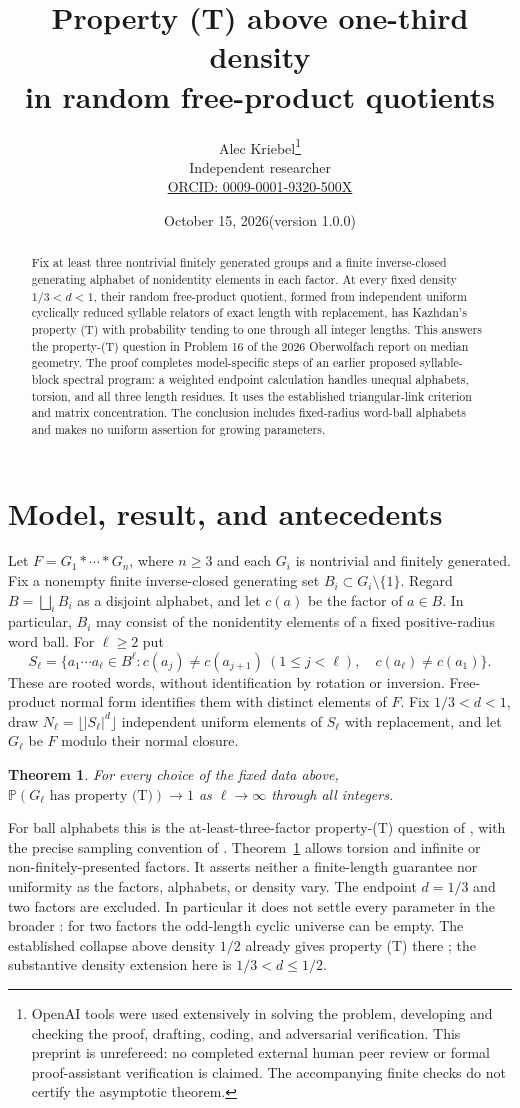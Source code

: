 \documentclass[11pt,letterpaper]{article}
\title{Property (T) above one-third density\texorpdfstring{\\}{ }in random free-product quotients}
\author{Alec Kriebel\thanks{OpenAI tools were used extensively in solving the problem, developing and checking the proof, drafting, coding, and adversarial verification. This preprint is unrefereed: no completed external human peer review or formal proof-assistant verification is claimed. The accompanying finite checks do not certify the asymptotic theorem.}\\
  \small Independent researcher\\
  \small\href{https://orcid.org/0009-0001-9320-500X}{ORCID: 0009-0001-9320-500X}}
\date{October 15, 2026\quad (version 1.0.0)}
\newtheorem{theorem}{Theorem}
\newcommand{\Prob}{\mathbb P}
\begin{document}
\maketitle
\begin{abstract}
Fix at least three nontrivial finitely generated groups and a finite inverse-closed generating alphabet of nonidentity elements in each factor. At every fixed density $1/3<d<1$, their random free-product quotient, formed from independent uniform cyclically reduced syllable relators of exact length with replacement, has Kazhdan's property (T) with probability tending to one through all integer lengths. This answers the property-(T) question in Problem 16 of the 2026 Oberwolfach report on median geometry. The proof completes model-specific steps of an earlier proposed syllable-block spectral program: a weighted endpoint calculation handles unequal alphabets, torsion, and all three length residues. It uses the established triangular-link criterion and matrix concentration. The conclusion includes fixed-radius word-ball alphabets and makes no uniform assertion for growing parameters.
\end{abstract}

\section{Model, result, and antecedents}
Let $F=G_1*\cdots*G_n$, where $n\geq3$ and each $G_i$ is nontrivial and finitely generated. Fix a nonempty finite inverse-closed generating set $B_i\subset G_i\setminus\{1\}$. Regard $B=\bigsqcup_i B_i$ as a disjoint alphabet, and let $c(a)$ be the factor of $a\in B$. In particular, $B_i$ may consist of the nonidentity elements of a fixed positive-radius word ball. For $\ell\geq2$ put
\[
 S_\ell=\{a_1\cdots a_\ell\in B^\ell:
 c(a_j)\ne c(a_{j+1})\ (1\leq j<\ell),\quad
 c(a_\ell)\ne c(a_1)\}.
\]
These are rooted words, without identification by rotation or inversion. Free-product normal form identifies them with distinct elements of $F$. Fix $1/3<d<1$, draw $N_\ell=\lfloor |S_\ell|^d\rfloor$ independent uniform elements of $S_\ell$ with replacement, and let $G_\ell$ be $F$ modulo their normal closure.

\begin{theorem}\label{thm:main}
For every choice of the fixed data above,
$\Prob(G_\ell\text{ has property (T)})\longrightarrow1$ as $\ell\to\infty$ through all integers.
\end{theorem}

For ball alphabets this is the at-least-three-factor property-(T) question of \cite[Problem 16, pp.~535--536]{owr}, with the precise sampling convention of \cite[Definition 1.1]{rqfp}. Theorem~\ref{thm:main} allows torsion and infinite or non-finitely-presented factors. It asserts neither a finite-length guarantee nor uniformity as the factors, alphabets, or density vary. The endpoint $d=1/3$ and two factors are excluded. In particular it does not settle every parameter in the broader \cite[Question 1.9]{rqfp}: for two factors the odd-length cyclic universe can be empty. The established collapse above density $1/2$ already gives property (T) there \cite[Theorem 1.2]{rqfp}; the substantive density extension here is $1/3<d\leq1/2$.
\end{document}

